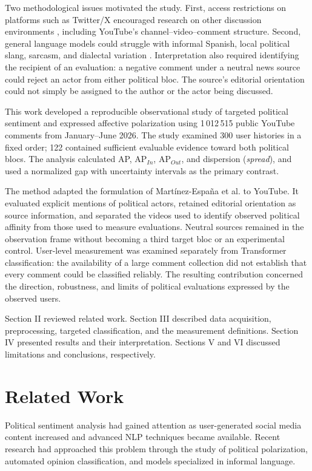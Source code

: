 \documentclass[conference, letterpaper]{IEEEtran}
\begin{document}
Two methodological issues motivated the study. First, access restrictions on platforms such as Twitter/X encouraged research on other discussion environments \cite{ANTONAKAKI2021114006}, including YouTube's channel--video--comment structure. Second, general language models could struggle with informal Spanish, local political slang, sarcasm, and dialectal variation \cite{10.1145/3446132.3446424,robertuito}. Interpretation also required identifying the recipient of an evaluation: a negative comment under a neutral news source could reject an actor from either political bloc. The source's editorial orientation could not simply be assigned to the author or the actor being discussed.

This work developed a reproducible observational study of targeted political sentiment and expressed affective polarization using 1\,012\,515 public YouTube comments from January--June 2026. The study examined 300 user histories in a fixed order; 122 contained sufficient evaluable evidence toward both political blocs. The analysis calculated AP, $\mathrm{AP}_{In}$, $\mathrm{AP}_{Out}$, and dispersion (\textit{spread}), and used a normalized gap with uncertainty intervals as the primary contrast.

The method adapted the formulation of Martínez-España et al. \cite{polariz} to YouTube. It evaluated explicit mentions of political actors, retained editorial orientation as source information, and separated the videos used to identify observed political affinity from those used to measure evaluations. Neutral sources remained in the observation frame without becoming a third target bloc or an experimental control. User-level measurement was examined separately from Transformer classification: the availability of a large comment collection did not establish that every comment could be classified reliably. The resulting contribution concerned the direction, robustness, and limits of political evaluations expressed by the observed users.

Section II reviewed related work. Section III described data acquisition, preprocessing, targeted classification, and the measurement definitions. Section IV presented results and their interpretation. Sections V and VI discussed limitations and conclusions, respectively.

\section{Related Work}
Political sentiment analysis had gained attention as user-generated social media content increased and advanced NLP techniques became available. Recent research had approached this problem through the study of political polarization, automated opinion classification, and models specialized in informal language.
\end{document}
